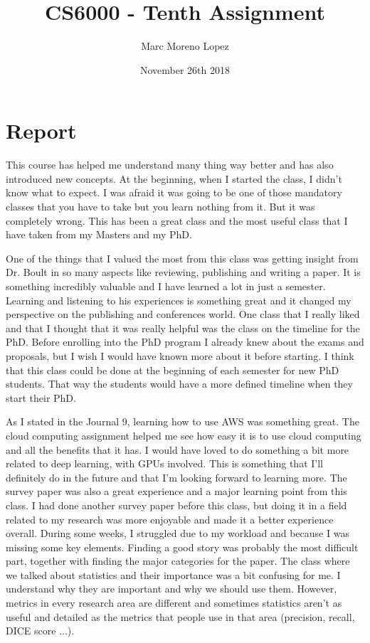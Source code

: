 \documentclass{article}
\title{CS6000 - Tenth Assignment}
\author{Marc Moreno Lopez}
\date{November 26th 2018}
\begin{document}
\maketitle

\section{Report}


This course has helped me understand many thing way better and has also introduced new concepts. At the beginning, when I started the class, I didn't know what to expect. I was afraid it was going to be one of those mandatory classes that you have to take but you learn nothing from it. But it was completely wrong. This has been a great class and the most useful class that I have taken from my Masters and my PhD. 

One of the things that I valued the most from this class was getting insight from Dr. Boult in so many aspects like reviewing, publishing and writing a paper. It is something incredibly valuable and I have learned a lot in just a semester. Learning and listening to his experiences is something great and it changed my perspective on the publishing and conferences world. One class that I really liked and that I thought that it was really helpful was the class on the timeline for the PhD. Before enrolling into the PhD program I already knew about the exams and proposals, but I wish I would have known more about it before starting. I think that this class could be done at the beginning of each semester for new PhD students. That way the students would have a more defined timeline when they start their PhD. 

As I stated in the Journal 9, learning how to use AWS was something great. The cloud computing assignment helped me see how easy it is to use cloud computing and all the benefits that it has. I would have loved to do something a bit more related to deep learning, with GPUs involved. This is something that I'll definitely do in the future and that I'm looking forward to learning more. The survey paper was also a great experience and a major learning point from this class. I had done another survey paper before this class, but doing it in a field related to my research was more enjoyable and made it a better experience overall. During some weeks, I struggled due to my workload and because I was missing some key elements. Finding a good story was probably the most difficult part, together with finding the major categories for the paper. The class where we talked about statistics and their importance was a bit confusing for me. I understand why they are important and why we should use them. However, metrics in every research area are different and sometimes statistics aren't as useful and detailed as the metrics that people use in that area (precision, recall, DICE score ...).
\end{document}
